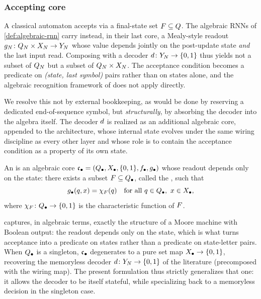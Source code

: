 \documentclass{article}
\begin{document}
\subsubsection{Accepting core}
A classical automaton accepts via a final-state set $F \subseteq Q$. 
The algebraic RNNs of \cref{def:algebraic-rnn} carry instead, in their last core, a Mealy-style readout $g_N \colon Q_N \times X_N \to Y_N$ whose value depends jointly on the post-update state \emph{and} the last input read. 
Composing with a decoder $d \colon Y_N \to \{0,1\}$ thus yields not a subset of $Q_N$ but a subset of $Q_N \times X_N$. 
The acceptance condition becomes a predicate on \emph{(state, last symbol)} pairs rather than on states alone, and the algebraic recognition framework of \citet{eilenberg1976} does not apply directly.

We resolve this not by external bookkeeping, as would be done by reserving a dedicated end-of-sequence symbol, but \emph{structurally}, by absorbing the decoder into the algebra itself. 
The decoder $d$ is realized as an additional algebraic core, appended to the architecture, whose internal state evolves under the same wiring discipline as every other layer and whose role is to contain the acceptance condition as a property of its own state.

\begin{definition}\label{def:accepting-core}
An  is an algebraic core ${\mathfrak{c}_{\bullet}} = (Q_\bullet, X_\bullet, \{0,1\}, f_\bullet, g_\bullet)$ whose readout depends only on the state: there exists a subset $F \subseteq Q_\bullet$, called the , such that
$$
g_\bullet(q, x) = \chi_{F}(q) \quad \text{for all } q \in Q_\bullet,\ x \in X_\bullet,
$$
where $\chi_{F} \colon Q_\bullet \to \{0,1\}$ is the characteristic function of $F$.
\end{definition}

\begin{remark}\label{rem:moore-content}
 captures, in algebraic terms, exactly the structure of a Moore machine with Boolean output: the readout depends only on the state, which is what turns acceptance into a predicate on states rather than a predicate on state-letter pairs. 
When $Q_\bullet$ is a singleton, ${\mathfrak{c}_{\bullet}}$ degenerates to a pure set map $X_\bullet \to \{0,1\}$, recovering the memoryless decoder $d \colon Y_N \to \{0,1\}$ of the literature (precomposed with the wiring map). 
The present formulation thus strictly generalizes that one: it allows the decoder to be itself stateful, while specializing back to a memoryless decision in the singleton case.
\end{remark}
\end{document}
